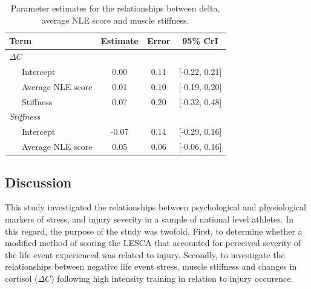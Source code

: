 \documentclass[
  english,
  man,floatsintext]{apa6}
\begin{document}
\begin{table}[H]

\begin{center}
\begin{threeparttable}

\caption{\label{tab:datatab2}Parameter estimates for the relationships between delta, average NLE score and muscle stiffness.}

\begin{tabular}{lccc}
\toprule
Term & Estimate & Error & 95\% CrI\\
\midrule
$\Delta C$ &  &  & \\
\ \ \ Intercept & 0.00 & 0.11 & [-0.22, 0.21]\\
\ \ \ Average NLE score & 0.01 & 0.10 & [-0.19, 0.20]\\
\ \ \ Stiffness & 0.07 & 0.20 & [-0.32, 0.48]\\
\textit{Stiffness} &  &  & \\
\ \ \ Intercept & -0.07 & 0.14 & [-0.29, 0.16]\\
\ \ \ Average NLE score & 0.05 & 0.06 & [-0.06, 0.16]\\
\bottomrule
\end{tabular}

\end{threeparttable}
\end{center}

\end{table}

\hypertarget{discussion-1}{%
\subsection{Discussion}\label{discussion-1}}

This study investigated the relationships between psychological and physiological markers of stress, and injury severity in a sample of national level athletes.
In this regard, the purpose of the study was twofold.
First, to determine whether a modified method of scoring the LESCA that accounted for perceived severity of the life event experienced was related to injury.
Secondly, to investigate the relationships between negative life event stress, muscle stiffness and changes in cortisol (\(\Delta C\)) following high intensity training in relation to injury occurence.
\end{document}
